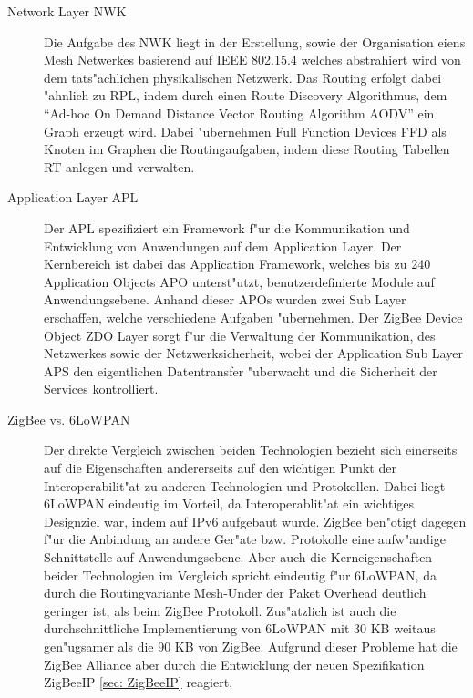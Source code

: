 \documentclass[final]{lktseminar}
\begin{document}
\begin{description}
    \item[Network Layer NWK] Die Aufgabe des NWK liegt in der Erstellung, sowie der Organisation
    eiens Mesh Netwerkes basierend auf IEEE 802.15.4 welches abstrahiert wird von dem tats"achlichen
    physikalischen Netzwerk. Das Routing erfolgt dabei "ahnlich zu RPL, indem durch einen Route Discovery Algorithmus,
    dem ``Ad-hoc On Demand Distance Vector Routing Algorithm AODV'' ein Graph erzeugt wird. Dabei "ubernehmen
    Full Function Devices FFD als Knoten im Graphen die Routingaufgaben, indem diese Routing Tabellen RT anlegen und verwalten.

    \item[Application Layer APL] Der APL spezifiziert ein Framework f"ur die Kommunikation und Entwicklung von Anwendungen
    auf dem Application Layer. Der Kernbereich ist dabei das Application Framework, welches bis zu 240 Application Objects APO
    unterst"utzt, benutzerdefinierte Module auf Anwendungsebene. Anhand dieser APOs wurden zwei Sub Layer erschaffen, welche
    verschiedene Aufgaben "ubernehmen. Der ZigBee Device Object ZDO Layer sorgt f"ur die Verwaltung der Kommunikation, des Netzwerkes
    sowie der Netzwerksicherheit, wobei der Application Sub Layer APS den eigentlichen Datentransfer "uberwacht und die Sicherheit
    der Services kontrolliert.

    \item[ZigBee vs. 6LoWPAN] Der direkte Vergleich zwischen beiden Technologien bezieht sich einerseits auf die
    Eigenschaften andererseits auf den wichtigen Punkt der Interoperabilit"at zu anderen Technologien und Protokollen.
    Dabei liegt 6LoWPAN eindeutig im Vorteil, da Interoperablit"at ein wichtiges Designziel war, indem auf IPv6 aufgebaut wurde.
    ZigBee ben"otigt dagegen f"ur die Anbindung an andere Ger"ate bzw. Protokolle eine aufw"andige Schnittstelle auf Anwendungsebene.
    Aber auch die Kerneigenschaften beider Technologien im Vergleich spricht eindeutig f"ur 6LoWPAN, da durch die Routingvariante
    Mesh-Under der Paket Overhead deutlich geringer ist, als beim ZigBee Protokoll. Zus"atzlich ist auch die durchschnittliche
    Implementierung von 6LoWPAN mit 30 KB weitaus gen"ugsamer als die 90 KB von ZigBee.
    Aufgrund dieser Probleme hat die ZigBee Alliance aber durch die Entwicklung  der neuen Spezifikation ZigBeeIP \ref{sec: ZigBeeIP}
    reagiert.
\end{description}

\end{document}
